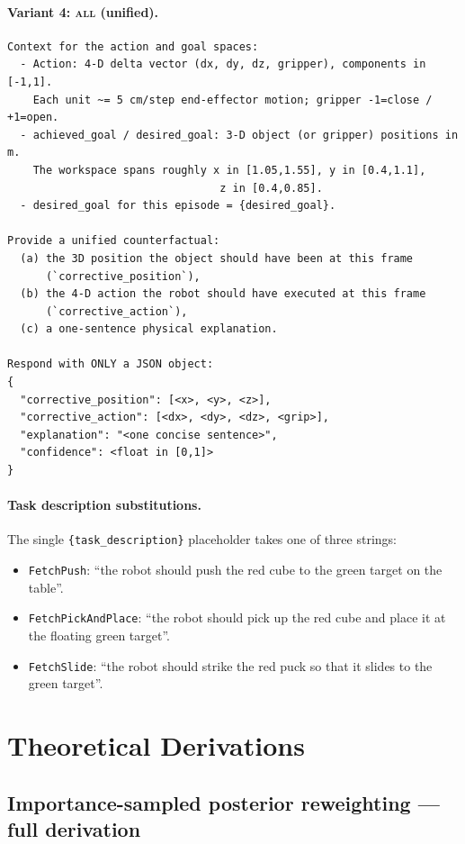 \paragraph{Variant 4: \textsc{all} (unified).}
{\small
\begin{verbatim}
Context for the action and goal spaces:
  - Action: 4-D delta vector (dx, dy, dz, gripper), components in [-1,1].
    Each unit ~= 5 cm/step end-effector motion; gripper -1=close / +1=open.
  - achieved_goal / desired_goal: 3-D object (or gripper) positions in m.
    The workspace spans roughly x in [1.05,1.55], y in [0.4,1.1],
                                 z in [0.4,0.85].
  - desired_goal for this episode = {desired_goal}.

Provide a unified counterfactual:
  (a) the 3D position the object should have been at this frame
      (`corrective_position`),
  (b) the 4-D action the robot should have executed at this frame
      (`corrective_action`),
  (c) a one-sentence physical explanation.

Respond with ONLY a JSON object:
{
  "corrective_position": [<x>, <y>, <z>],
  "corrective_action": [<dx>, <dy>, <dz>, <grip>],
  "explanation": "<one concise sentence>",
  "confidence": <float in [0,1]>
}
\end{verbatim}}

\paragraph{Task description substitutions.}
The single \texttt{\{task\_description\}} placeholder takes one of three
strings:
\begin{itemize}\itemsep0pt
\item \texttt{FetchPush}: ``the robot should push the red cube to the green target on the table''.
\item \texttt{FetchPickAndPlace}: ``the robot should pick up the red cube and place it at the floating green target''.
\item \texttt{FetchSlide}: ``the robot should strike the red puck so that it slides to the green target''.
\end{itemize}

\section{Theoretical Derivations}
\label{app:theory}

\subsection{Importance-sampled posterior reweighting --- full derivation}
\label{app:is-derivation}


